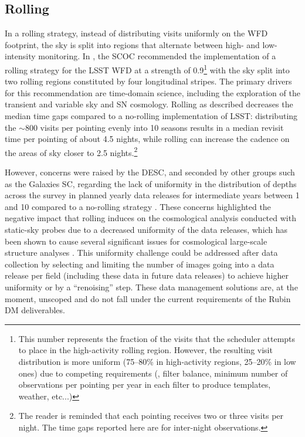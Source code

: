 \subsection{Rolling}\label{sec:rolling}
In a rolling strategy, instead of distributing visits uniformly on the WFD footprint, the sky is split into regions that alternate between high- and low-intensity monitoring. In , the SCOC recommended the implementation of a rolling strategy for the LSST WFD at a strength of 0.9\footnote{This number represents the fraction of the visits that the scheduler attempts to place in the high-activity rolling region. However, the resulting visit distribution is more uniform (75--80\% in high-activity regions, 25--20\% in low ones) due to competing requirements (\eg , filter balance, minimum number of observations per pointing per year in each filter to produce templates, weather, etc...)} 
with the sky split into two rolling regions constituted by four longitudinal stripes. The primary drivers for this recommendation are time-domain science, including the exploration of the transient and variable sky and SN cosmology. Rolling as described decreases the median time gaps compared to a no-rolling implementation of LSST:
distributing the $\sim$800 visits per pointing evenly into 10 seasons results in a median revisit time per pointing of about 4.5 nights, while rolling can increase the cadence on the areas of sky closer to 2.5 nights.\footnote{The reader is reminded that each pointing receives two or three visits per night. The time gaps reported here are for inter-night observations.}

 However, concerns were raised by the DESC, and seconded by other groups such as the Galaxies SC, regarding the lack of uniformity in the distribution of depths across the survey in planned yearly data releases for intermediate years between 1 and 10 compared to a no-rolling strategy \citep[see discussion in][which noted this as a potential future concern before the adoption of a rolling cadence as the baseline]{2022ApJS..259...58L}.  These concerns highlighted the negative impact that rolling induces on the cosmological analysis conducted with static-sky probes due to a decreased uniformity of the data releases, which has been shown to cause several significant issues for cosmological large-scale structure analyses \citep[\eg ,][]{2022PhRvD.105b3520A,2023JCAP...07..044B}.  
 This uniformity challenge could be addressed after data collection by selecting and limiting the number of images going into a data release per field (including these data in future data releases) to achieve higher uniformity or by a ``renoising'' step. These data management solutions are, at the moment, unscoped and do not fall under the current requirements of the Rubin DM deliverables.

